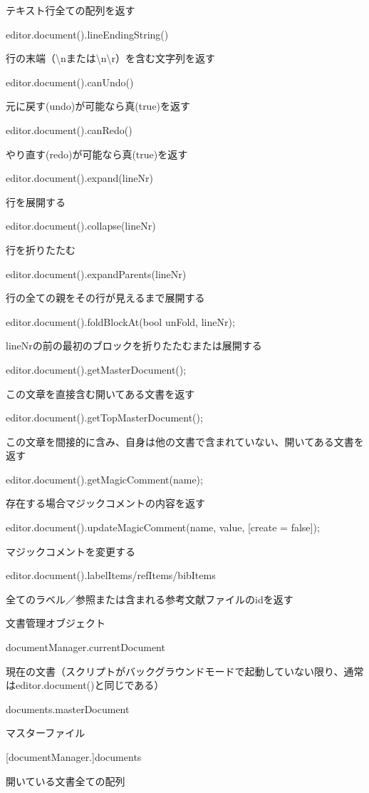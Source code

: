 \documentclass[]{book}
\begin{document}
テキスト行全ての配列を返す

editor.document().lineEndingString()

行の末端（\textbackslash{}nまたは\textbackslash{}n\textbackslash{}r）を含む文字列を返す

editor.document().canUndo()

元に戻す(undo)が可能なら真(true)を返す

editor.document().canRedo()

やり直す(redo)が可能なら真(true)を返す

editor.document().expand(lineNr)

行を展開する

editor.document().collapse(lineNr)

行を折りたたむ

editor.document().expandParents(lineNr)

行の全ての親をその行が見えるまで展開する

editor.document().foldBlockAt(bool unFold, lineNr);

lineNrの前の最初のブロックを折りたたむまたは展開する

editor.document().getMasterDocument();

この文章を直接含む開いてある文書を返す

editor.document().getTopMasterDocument();

この文章を間接的に含み、自身は他の文書で含まれていない、開いてある文書を返す

editor.document().getMagicComment(name);

存在する場合マジックコメントの内容を返す

editor.document().updateMagicComment(name, value, {[}create = false{]});

マジックコメントを変更する

editor.document().labelItems/refItems/bibItems

全てのラベル／参照または含まれる参考文献ファイルのidを返す

文書管理オブジェクト

documentManager.currentDocument

現在の文書（スクリプトがバックグラウンドモードで起動していない限り、通常はeditor.document()と同じである）

documents.masterDocument

マスターファイル

{[}documentManager.{]}documents

開いている文書全ての配列
\end{document}
